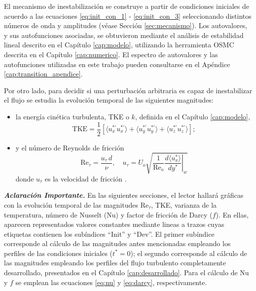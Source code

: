 El mecanismo de inestabilización se construye a partir de condiciones iniciales de acuerdo a las ecuaciones \ref{eq:init_con_1} - \ref{eq:init_con_3} seleccionando distintos números de onda y amplitudes (véase Sección \ref{sec:mecanismo}). Los autovalores, y sus autofunciones asociadas, se obtuvieron mediante el análisis de estabilidad lineal descrito en el Capítulo \ref{cap:modelo}, utilizando la herramienta OSMC descrita en el Capítulo \ref{cap:numerico}. El espectro de autovalores y las autofunciones utilizadas en este trabajo pueden consultarse en el Apéndice \ref{cap:transition_apendice}. 

Por otro lado, para decidir si una perturbación arbitraria es capaz de inestabilizar el flujo se estudia la evolución temporal de las siguientes magnitudes:

\begin{itemize}
  \item la energía cinética turbulenta, TKE o $k$, definida en el Capítulo \ref{cap:modelo},
  	\begin{equation*}
  		\text{TKE} = \frac{1}{2} \left[ \langle u^{* \prime}_x u^{* \prime}_x \rangle + \langle u^{* \prime}_y u^{* \prime}_y \rangle + \langle u^{* \prime}_z u^{* \prime}_z \rangle \right] ; 
  	\end{equation*}
  	
  

  \item y el número de Reynolds de fricción
        $$
          \text{Re}_{\tau} = \frac{u_{\tau}\,d}{\nu} , \quad u_{\tau}= U_o \sqrt{ \frac{1}{\text{Re}_o} \left. \frac{d \langle u^*_x \rangle}{dy^*} \right\vert_w }
        $$
        donde $u_{\tau}$ es la velocidad de fricción \cite{pope2001turbulent}.
\end{itemize}

\begin{table}[H]
\centering
{}
\caption{Parámetros adimensionales de los dos casos elegidos.}
\label{tab:cases}
\end{table}

\textit{\textbf{Aclaración Importante.}} En las siguientes secciones, el lector hallará gráficas con la evolución temporal de las magnitudes  Re$_{\tau}$, TKE, varianza de la temperatura, número de Nusselt (Nu) y factor de fricción de Darcy ($f$). En ellas, aparecen representados valores constantes mediante lineas a trazos cuyas etiquetas contienen los subíndices ``Init'' y ``Dev''. El primer subíndice corresponde al cálculo de las magnitudes antes mencionadas empleando los perfiles de las condiciones iniciales ($t^*=0$); el segundo corresponde al cálculo de las magnitudes empleando los perfiles del flujo turbulento completamente desarrollado, presentados en el Capítulo \ref{cap:desarrollado}. Para el cálculo de Nu y $f$ se emplean las ecuaciones \ref{eq:nu} y \ref{eq:darcy}, respectivamente.

